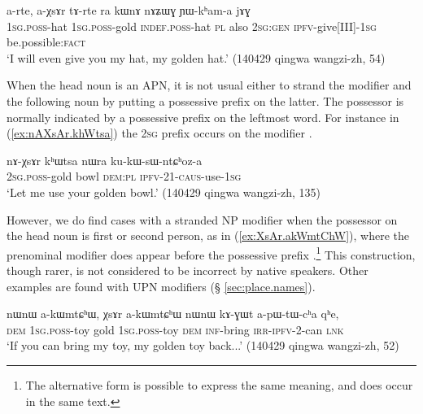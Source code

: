 \begin{exe}
\ex \label{ex:aXsAr.tArte}
\gll a-rte, a-χsɤr tɤ-rte ra kɯnɤ nɤʑɯɣ ɲɯ-kʰam-a jɤɣ \\
\textsc{1sg}.\textsc{poss}-hat \textsc{1sg}.\textsc{poss}-gold \textsc{indef}.\textsc{poss}-hat \textsc{pl} also \textsc{2sg:gen} \textsc{ipfv}-give[III]-\textsc{1sg} be.possible:\textsc{fact} \\
\glt `I will even give you my hat, my golden hat.' (140429 qingwa wangzi-zh, 54)
\end{exe}

When the head noun is an APN, it is not usual either to strand the modifier and the following noun by putting a possessive prefix on the latter. The possessor is normally indicated by a possessive prefix on the leftmost word. For instance in (\ref{ex:nAXsAr.khWtsa}) the \textsc{2sg} prefix  occurs on the modifier .

\begin{exe}
\ex \label{ex:nAXsAr.khWtsa}
\gll nɤ-χsɤr kʰɯtsa nɯra ku-kɯ-sɯ-ntɕʰoz-a \\
\textsc{2sg}.\textsc{poss}-gold bowl \textsc{dem}:\textsc{pl} \textsc{ipfv}-2\fl{}1-\textsc{caus}-use-\textsc{1sg} \\
\glt `Let me use your golden bowl.' (140429 qingwa wangzi-zh, 135)
\end{exe}

However, we do find cases with a stranded NP modifier when the possessor on the head noun is first or second person, as in (\ref{ex:XsAr.akWmtChW}), where the prenominal modifier  does appear before the possessive prefix .\footnote{The alternative form  is possible to express the same meaning, and does occur in the same text. } This construction, though rarer, is not considered to be incorrect by native speakers. Other examples are found with UPN modifiers (§ \ref{sec:place.names}).

\begin{exe}
\ex \label{ex:XsAr.akWmtChW}
\gll  nɯnɯ a-kɯmtɕʰɯ, χsɤr a-kɯmtɕʰɯ nɯnɯ kɤ-ɣɯt a-pɯ-tɯ-cʰa qʰe,  \\
\textsc{dem} \textsc{1sg}.\textsc{poss}-toy gold \textsc{1sg}.\textsc{poss}-toy \textsc{dem} \textsc{inf}-bring \textsc{irr}-\textsc{ipfv}-2-can \textsc{lnk} \\
\glt `If you can bring my toy, my golden toy back...' (140429 qingwa wangzi-zh, 52)
\end{exe}

